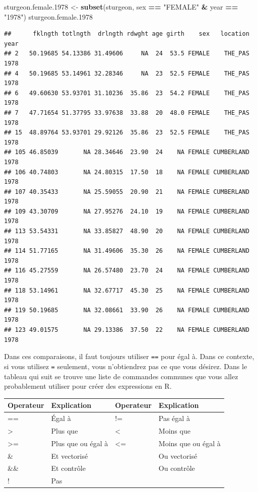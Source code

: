\documentclass[12pt,]{book}
\makeatletter
\newenvironment{Shaded}{\begin{snugshade}}{\end{snugshade}}
\newcommand{\FloatTok}[1]{\textcolor[rgb]{0.06,0.06,0.06}{#1}}
\newcommand{\KeywordTok}[1]{\textcolor[rgb]{0.27,0.27,0.27}{\textbf{#1}}}
\newcommand{\NormalTok}[1]{#1}
\newcommand{\OperatorTok}[1]{\textcolor[rgb]{0.43,0.43,0.43}{\textbf{#1}}}
\newcommand{\StringTok}[1]{\textcolor[rgb]{0.5,0.5,0.5}{#1}}
\newenvironment{kframe}{%
\medskip{}
\setlength{\fboxsep}{.8em}
 \def\at@end@of@kframe{}%
 \ifinner\ifhmode%
  \def\at@end@of@kframe{\end{minipage}}%
  \begin{minipage}{\columnwidth}%
 \fi\fi%
 \def\FrameCommand##1{\hskip\@totalleftmargin \hskip-\fboxsep
 \colorbox{shadecolor}{##1}\hskip-\fboxsep
     \hskip-\linewidth \hskip-\@totalleftmargin \hskip\columnwidth}%
 \MakeFramed {\advance\hsize-\width
   \@totalleftmargin\z@ \linewidth\hsize
   \@setminipage}}%
 {\par\unskip\endMakeFramed%
 \at@end@of@kframe}
\newenvironment{rmdblock}[1]
  {
  \begin{itemize}
  \renewcommand{\labelitemi}{
    \raisebox{-.7\height}[0pt][0pt]{
      {\setkeys{Gin}{width=3em,keepaspectratio}\texttt{[image: images/\#1]}}
    }
  }
  \setlength{\fboxsep}{1em}
  \begin{kframe}
  \item
  }
  {
  \end{kframe}
  \end{itemize}
  }
\newenvironment{rmdcaution}
  {\begin{rmdblock}{caution}}
  {\end{rmdblock}}
\makeatother
\begin{document}
\begin{Shaded}
\begin{Highlighting}[]
\NormalTok{sturgeon.female}\FloatTok{.1978}\NormalTok{ <-}\StringTok{ }\KeywordTok{subset}\NormalTok{(sturgeon, sex }\OperatorTok{==}\StringTok{ "FEMALE"} \OperatorTok{&}\StringTok{ }\NormalTok{year }\OperatorTok{==}\StringTok{ "1978"}\NormalTok{)}
\NormalTok{sturgeon.female}\FloatTok{.1978}
\end{Highlighting}
\end{Shaded}

\begin{verbatim}
##      fklngth totlngth  drlngth rdwght age girth    sex   location year
## 2   50.19685 54.13386 31.49606     NA  24  53.5 FEMALE    THE_PAS 1978
## 4   50.19685 53.14961 32.28346     NA  23  52.5 FEMALE    THE_PAS 1978
## 6   49.60630 53.93701 31.10236  35.86  23  54.2 FEMALE    THE_PAS 1978
## 7   47.71654 51.37795 33.97638  33.88  20  48.0 FEMALE    THE_PAS 1978
## 15  48.89764 53.93701 29.92126  35.86  23  52.5 FEMALE    THE_PAS 1978
## 105 46.85039       NA 28.34646  23.90  24    NA FEMALE CUMBERLAND 1978
## 106 40.74803       NA 24.80315  17.50  18    NA FEMALE CUMBERLAND 1978
## 107 40.35433       NA 25.59055  20.90  21    NA FEMALE CUMBERLAND 1978
## 109 43.30709       NA 27.95276  24.10  19    NA FEMALE CUMBERLAND 1978
## 113 53.54331       NA 33.85827  48.90  20    NA FEMALE CUMBERLAND 1978
## 114 51.77165       NA 31.49606  35.30  26    NA FEMALE CUMBERLAND 1978
## 116 45.27559       NA 26.57480  23.70  24    NA FEMALE CUMBERLAND 1978
## 118 53.14961       NA 32.67717  45.30  25    NA FEMALE CUMBERLAND 1978
## 119 50.19685       NA 32.08661  33.90  26    NA FEMALE CUMBERLAND 1978
## 123 49.01575       NA 29.13386  37.50  22    NA FEMALE CUMBERLAND 1978
\end{verbatim}

\begin{rmdcaution}
Dans ces comparaisons, il faut toujours utiliser \texttt{==} pour égal à.
Dans ce contexte, si vous utilisez \texttt{=} seulement, vous n'obtiendrez pas ce que vous désirez.
Dans le tableau qui suit se trouve une liste de commandes communes que vous allez probablement utiliser pour créer des expressions en R.
\end{rmdcaution}

\begin{longtable}[]{@{}llll@{}}
\toprule
Operateur & Explication & Operateur & Explication\tabularnewline
\midrule
\endhead
== & Égal à & != & Pas égal à\tabularnewline
\textgreater{} & Plus que & \textless{} & Moins que\tabularnewline
\textgreater{}= & Plus que ou égal à & \textless{}= & Moins que ou égal à\tabularnewline
\& & Et vectorisé & \textbar{} & Ou vectorisé\tabularnewline
\&\& & Et contrôle & \textbar{}\textbar{} & Ou contrôle\tabularnewline
! & Pas & &\tabularnewline
\bottomrule
\end{longtable}
\end{document}
